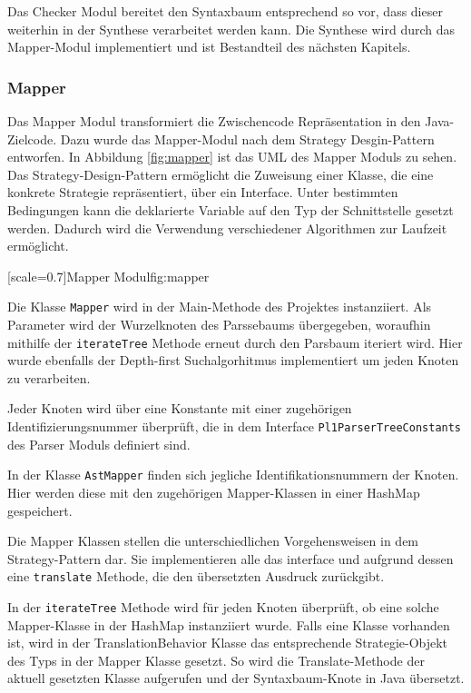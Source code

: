 Das Checker Modul bereitet den Syntaxbaum entsprechend so vor, dass dieser weiterhin in der Synthese verarbeitet werden kann.
Die Synthese wird durch das Mapper-Modul implementiert und ist Bestandteil des nächsten Kapitels.
 
 \pagebreak
\subsubsection{Mapper}
Das Mapper Modul transformiert die Zwischencode Repräsentation in den Java-Zielcode. Dazu wurde das Mapper-Modul nach dem Strategy Desgin-Pattern entworfen.
In Abbildung \ref{fig:mapper} ist das UML des Mapper Moduls zu sehen. 
Das Strategy-Design-Pattern ermöglicht die Zuweisung einer Klasse, die eine konkrete Strategie repräsentiert, über ein Interface. Unter bestimmten Bedingungen kann die deklarierte Variable auf den Typ der Schnittstelle gesetzt werden. Dadurch wird die Verwendung verschiedener Algorithmen zur Laufzeit ermöglicht. 

[scale=0.7]{Mapper Modul}{fig:mapper}
\pagebreak

Die Klasse \verb+Mapper+ wird in der Main-Methode des Projektes instanziiert. Als Parameter wird der Wurzelknoten des Parssebaums übergegeben,
woraufhin mithilfe der \verb+iterateTree+ Methode erneut durch den Parsbaum iteriert wird. Hier wurde ebenfalls der Depth-first Suchalgorhitmus implementiert um jeden Knoten zu verarbeiten. 

Jeder Knoten wird über eine Konstante mit einer zugehörigen Identifizierungsnummer überprüft, die in dem Interface \verb+Pl1ParserTreeConstants+ des Parser Moduls definiert sind. 

In der Klasse \verb+AstMapper+ finden sich jegliche Identifikationsnummern der Knoten. Hier werden diese mit den zugehörigen Mapper-Klassen in einer HashMap gespeichert.

Die Mapper Klassen stellen die unterschiedlichen Vorgehensweisen in dem Strategy-Pattern dar. Sie implementieren alle das  interface und aufgrund dessen eine \verb+translate+ Methode, die den übersetzten Ausdruck zurückgibt. 

In der \verb+iterateTree+ Methode wird für jeden Knoten überprüft, ob eine solche Mapper-Klasse in der HashMap instanziiert wurde.
Falls eine Klasse vorhanden ist, wird in der TranslationBehavior Klasse das entsprechende Strategie-Objekt
des Typs  in der
Mapper Klasse gesetzt. So wird die Translate-Methode der aktuell gesetzten Klasse aufgerufen und der Syntaxbaum-Knote in Java übersetzt.


